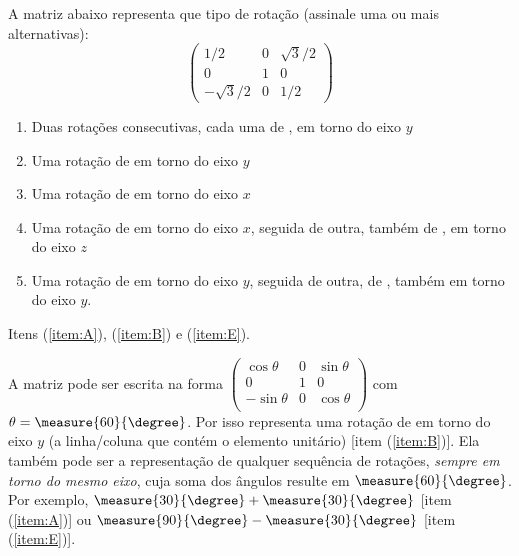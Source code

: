 \begin{question}
    A matriz abaixo representa que tipo de rotação (assinale uma ou mais alternativas):
    \begin{equation*}
      \begin{pmatrix}
                1/2 & 0 & \sqrt{3}/2 \\
                  0 & 1 &          0 \\
        -\sqrt{3}/2 & 0 &        1/2
      \end{pmatrix}
    \end{equation*}

    \begin{enumerate}
      \item\label{item:A} Duas rotações consecutivas, cada uma de , em torno do eixo $y$
      \item\label{item:B} Uma rotação de  em torno do eixo $y$
      \item Uma rotação de  em torno do eixo $x$
      \item Uma rotação de  em torno do eixo $x$, seguida de outra, também de , em torno do eixo $z$
      \item\label{item:E} Uma rotação de  em torno do eixo $y$, seguida de outra, de , também em torno do eixo $y$.
    \end{enumerate}

    \begin{answer}
      Itens (\ref{item:A}), (\ref{item:B}) e (\ref{item:E}).
    \end{answer}

    \begin{solution}
    A matriz pode ser escrita na forma
      $\begin{pmatrix}
        \cos\theta  & 0 & \sin\theta \\
        0           & 1 & 0\\
        -\sin\theta & 0 & \cos\theta\\
      \end{pmatrix}$ com $\theta = \measure{60}{\degree}$.
      Por isso representa uma rotação de  em torno do eixo $y$ (a linha/coluna que contém o elemento unitário) [item (\ref{item:B})].
      Ela também pode ser a representação de qualquer sequência de rotações, \emph{sempre em torno do mesmo eixo}, cuja soma dos ângulos resulte em $\measure{60}{\degree}$.
      Por exemplo, $\measure{30}{\degree} + \measure{30}{\degree}$ [item (\ref{item:A})] ou $\measure{90}{\degree} - \measure{30}{\degree}$ [item (\ref{item:E})].
    \end{solution}
\end{question}